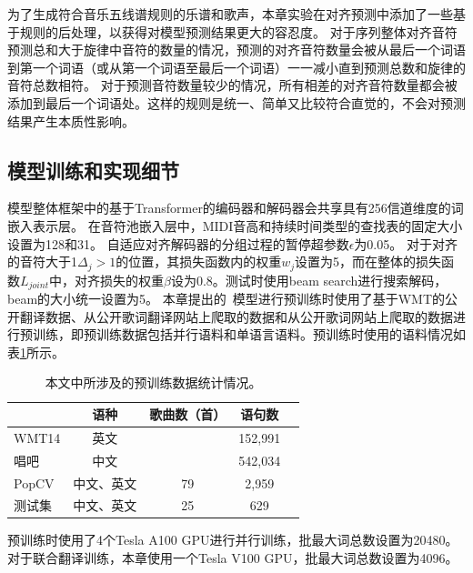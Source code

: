 为了生成符合音乐五线谱规则的乐谱和歌声，本章实验在对齐预测中添加了一些基于规则的后处理，以获得对模型预测结果更大的容忍度。
对于序列整体对齐音符预测总和大于旋律中音符的数量的情况，预测的对齐音符数量会被从最后一个词语到第一个词语（或从第一个词语至最后一个词语）一一减小直到预测总数和旋律的音符总数相符。
对于预测音符数量较少的情况，所有相差的对齐音符数量都会被添加到最后一个词语处。这样的规则是统一、简单又比较符合直觉的，不会对预测结果产生本质性影响。
\subsection{模型训练和实现细节}
模型整体框架中的基于Transformer的编码器和解码器会共享具有256信道维度的词嵌入表示层。
在音符池嵌入层中，MIDI音高和持续时间类型的查找表的固定大小设置为128和31。
自适应对齐解码器的分组过程的暂停超参数$\epsilon$为0.05。
对于对齐的音符大于1$\Delta_j>1$的位置，其损失函数内的权重$w_j$设置为5，而在整体的损失函数$L_{joint}$中，对齐损失的权重$\beta$设为0.8。测试时使用beam search进行搜索解码，beam的大小统一设置为5。
本章提出的\modelname~模型进行预训练时使用了基于WMT的公开翻译数据、从公开歌词翻译网站上爬取的数据和从公开歌词网站上爬取的数据进行预训练，即预训练数据包括并行语料和单语言语料。预训练时使用的语料情况如表\ref{tab:pretrain_data}所示。
\begin{table}[htbp]
    \centering
    \setlength{\belowcaptionskip}{8pt} %
    \caption{本文中所涉及的预训练数据统计情况。}
    \begin{tabular}{|l|c|c|c|c|}
    \hline
         & 语种 & 歌曲数（首） & 语句数\\
    \hline
     WMT14 & 英文 & \diagbox[]{}{} & 152,991\\
    \hline
     唱吧 & 中文 & \diagbox[]{}{} & 542,034\\
    \hline
     PopCV & 中文、英文 & 79 & 2,959\\
    \hline
     测试集 & 中文、英文 & 25 & 629\\
    \hline
    \end{tabular}
    \label{tab:pretrain_data}
\end{table}
预训练时使用了4个Tesla A100 GPU进行并行训练，批最大词总数设置为20480。
对于联合翻译训练，本章使用一个Tesla V100 GPU，批最大词总数设置为4096。


